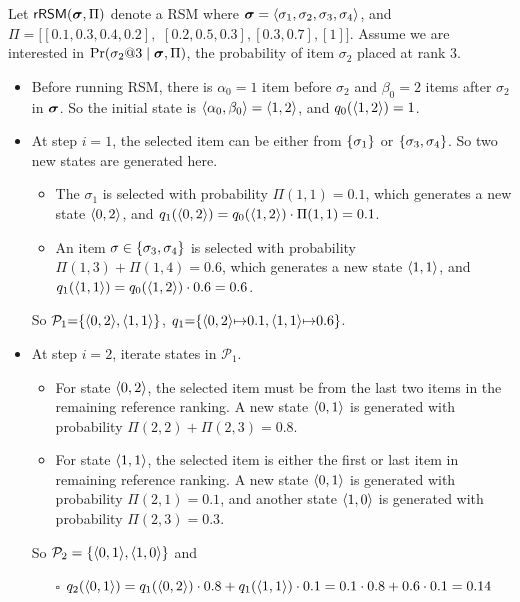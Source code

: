 \begin{example}
Let $\mathsf{rRSM}(\bm{\sigma}, \Pi)$ denote a RSM where $\bm{\sigma}=\langle \sigma_1, \sigma_2, \sigma_3, \sigma_4 \rangle$, and $\Pi = [[0.1, 0.3, 0.4, 0.2],$ $[0.2, 0.5, 0.3], [0.3, 0.7],[1]]$.
Assume we are interested in $\Pr(\sigma_2 @ 3 \mid \bm{\sigma}, \Pi)$, the probability of item $\sigma_2$ placed at rank $3$.
\begin{itemize}
    \itemsep -0.1em
    \item Before running RSM, there is $\alpha_0 = 1$ item before $\sigma_2$ and $\beta_0 = 2$ items after $\sigma_2$ in $\bm{\sigma}$. So the initial state is $\langle \alpha_0, \beta_0 \rangle = \langle 1, 2 \rangle$, and $q_0(\langle 1, 2 \rangle) = 1$.
    \item At step $i = 1$, the selected item can be either from $\{ \sigma_1 \}$ or $\{ \sigma_3, \sigma_4 \}$. So two new states are generated here.
    \begin{itemize}
        \item The $\sigma_1$ is selected with probability $\Pi(1, 1) = 0.1$, which generates a new state $\langle 0, 2 \rangle$, and $q_1(\langle 0,2 \rangle) = q_0(\langle 1,2 \rangle) \cdot \Pi(1, 1) = 0.1$.
        \item An item $\sigma \in \{ \sigma_3, \sigma_4 \}$ is selected with probability $\Pi(1, 3) + \Pi(1, 4) = 0.6$, which generates a new state $\langle 1, 1 \rangle$, and $q_1(\langle 1, 1 \rangle) = q_0(\langle 1,2 \rangle) \cdot 0.6 = 0.6$.
    \end{itemize}
    So $\mathcal{P}_1 {=} \{ \langle 0, 2 \rangle, \langle 1, 1 \rangle \}$, $q_1 {=} \{ \langle 0, 2 \rangle {\mapsto} 0.1, \langle 1, 1 \rangle {\mapsto} 0.6 \}$.
    \item At step $i = 2$, iterate states in $\mathcal{P}_1$.
    \begin{itemize}
        \item For state $\langle 0, 2 \rangle$, the selected item must be from the last two items in the remaining reference ranking. A new state $\langle 0, 1 \rangle$ is generated with probability $\Pi(2, 2) + \Pi(2, 3) = 0.8$.
        \item For state $\langle 1, 1 \rangle$, the selected item is either the first or last item in remaining reference ranking. A new state $\langle 0, 1 \rangle$ is generated with probability $\Pi(2, 1) = 0.1$, and another state $\langle 1, 0 \rangle$ is generated with probability $\Pi(2, 3) = 0.3$.
    \end{itemize}
    So $\mathcal{P}_2 = \{ \langle 0, 1 \rangle, \langle 1, 0 \rangle \}$ and
    \begin{itemize}
        \item[$\square$] $q_2(\langle 0, 1 \rangle) = q_1(\langle 0, 2 \rangle) \cdot 0.8 + q_1(\langle 1, 1 \rangle) \cdot 0.1 = 0.1 \cdot 0.8 + 0.6 \cdot 0.1 = 0.14$

\end{itemize}
\end{itemize}
\end{example}
